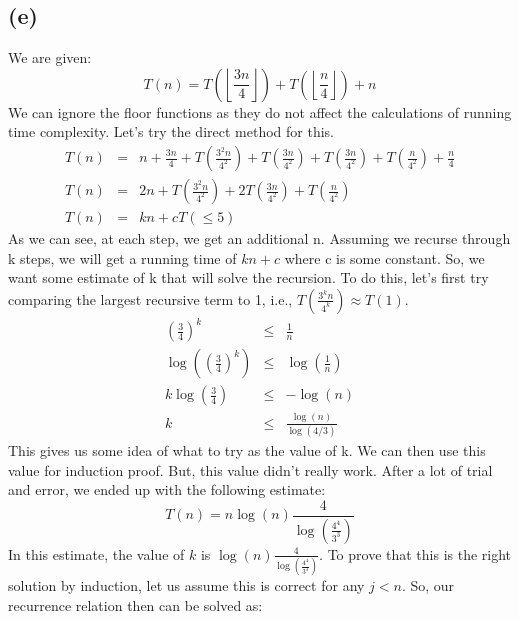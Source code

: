 \documentclass[a4paper,12pt]{article} %
\begin{document}
\subsection*{(e)}
We are given:
\begin{equation*}
    T(n) = T\left(\left \lfloor \frac{3n}{4} \right \rfloor \right) + T\left(\left \lfloor \frac{n}{4} \right \rfloor \right) + n
\end{equation*}
We can ignore the floor functions as they do not affect the calculations of running time complexity. Let's try the direct method for this. 
\begin{eqnarray*}
    T(n) &=& n + \frac{3n}{4} + T\left( \frac{3^2n}{4^2} \right) + T\left(\frac{3n}{4^2} \right) + T\left(\frac{3n}{4^2} \right) + T\left( \frac{n}{4^2} \right) + \frac{n}{4} \\
    T(n) &=& 2n + T\left( \frac{3^2n}{4^2} \right) + 2T\left( \frac{3n}{4^2} \right) + T\left(\frac{n}{4^2} \right)\\
    T(n) &=& kn + cT(\leq 5)
\end{eqnarray*}
As we can see, at each step, we get an additional n. Assuming we recurse through k steps, we will get a running time of $kn + c$ where c is some constant. So, we want some estimate of k that will solve the recursion. To do this, let's first try comparing the largest recursive term to 1, i.e., $T\left(\frac{3^kn}{4^k}\right) \approx T(1)$. 
\begin{eqnarray*}
    \left(\frac{3}{4}\right)^k &\leq& \frac{1}{n}\\
    \log\left(\left(\frac{3}{4}\right)^k \right) &\leq& \log\left(\frac{1}{n}\right)\\
    k\log\left(\frac{3}{4}\right) &\leq& -\log(n)\\
    k &\leq& \frac{\log(n)}{\log(4/3)}
\end{eqnarray*}
This gives us some idea of what to try as the value of k. We can then use this value for induction proof. But, this value didn't really work. After a lot of trial and error, we ended up with the following estimate:
\begin{equation}
    T(n) = n\log(n)\frac{4}{\log\left(\frac{4^4}{3^3}\right)}
\end{equation}
In this estimate, the value of $k$ is $\log(n)\frac{4}{\log\left(\frac{4^4}{3^3}\right)}$. To prove that this is the right solution by induction, let us assume this is correct for any $j<n$. So, our recurrence relation then can be solved as:\\
\end{document}
